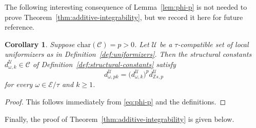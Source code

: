 \documentclass[preprint,12pt]{elsarticle}
\numberwithin{equation}{section} %
\theoremstyle{theorem}
\newtheorem{corollary}[theorem]{Corollary}
\theoremstyle{definition}
\newcommand{\Ca}{\mathcal{C}} %
\newcommand{\ec}{\mathcal{E}} %
\newcommand{\orbita}{{\ec/\tau}} %
\newcommand{\Z}{\mathbb{Z}} %
\begin{document}
The following interesting consequence of Lemma~\ref{lem:phi-p} is not needed to prove Theorem~\ref{thm:additive-integrability}, but we record it here for future reference.

\begin{corollary}\label{cor:phi-p} Suppose $\mathrm{char}(\Ca)=p>0$. Let $\mathcal{U}$ be a $\tau$-compatible set of local uniformizers as in Definition~\ref{def:uniformizers}. Then the structural constants $d^\mathcal{U}_{\omega,k}\in\Ca$ of Definition~\ref{def:structural-constants} satisfy \[d^\mathcal{U}_{\omega,pk}=\bigl(d^\mathcal{U}_{\omega,k}\bigr)^pd^\mathcal{U}_{\Z s,p}\] for every $\omega\in\orbita$ and $k\geq 1$.
\end{corollary}

\begin{proof}
    This follows immediately from \eqref{eq:phi-p} and the definitions.
\end{proof}


Finally, the proof of Theorem~\ref{thm:additive-integrability} is given below.
\end{document}
